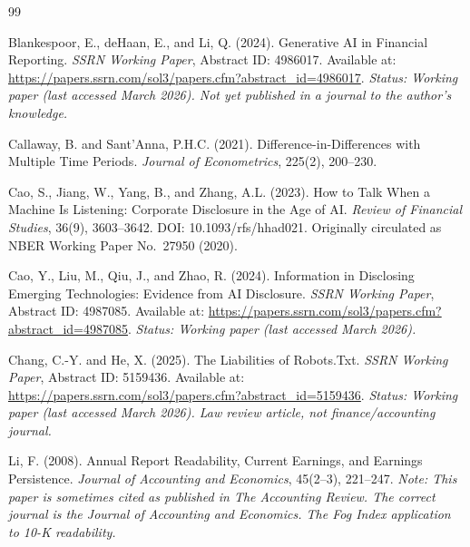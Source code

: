 \documentclass[12pt,a4paper]{article}
\begin{document}

\newpage
\begin{thebibliography}{99}

Blankespoor, E., deHaan, E., and Li, Q. (2024).
\newblock Generative AI in Financial Reporting.
\newblock \emph{SSRN Working Paper}, Abstract ID: 4986017.
\newblock Available at: \url{https://papers.ssrn.com/sol3/papers.cfm?abstract_id=4986017}.
\newblock \textit{Status: Working paper (last accessed March 2026). Not yet published in a journal to the author's knowledge.}

Callaway, B. and Sant'Anna, P.H.C. (2021).
\newblock Difference-in-Differences with Multiple Time Periods.
\newblock \emph{Journal of Econometrics}, 225(2), 200--230.

Cao, S., Jiang, W., Yang, B., and Zhang, A.L. (2023).
\newblock How to Talk When a Machine Is Listening: Corporate Disclosure in the Age of AI.
\newblock \emph{Review of Financial Studies}, 36(9), 3603--3642.
\newblock DOI: 10.1093/rfs/hhad021. Originally circulated as NBER Working Paper No.\ 27950 (2020).

Cao, Y., Liu, M., Qiu, J., and Zhao, R. (2024).
\newblock Information in Disclosing Emerging Technologies: Evidence from AI Disclosure.
\newblock \emph{SSRN Working Paper}, Abstract ID: 4987085.
\newblock Available at: \url{https://papers.ssrn.com/sol3/papers.cfm?abstract_id=4987085}.
\newblock \textit{Status: Working paper (last accessed March 2026).}

Chang, C.-Y. and He, X. (2025).
\newblock The Liabilities of Robots.Txt.
\newblock \emph{SSRN Working Paper}, Abstract ID: 5159436.
\newblock Available at: \url{https://papers.ssrn.com/sol3/papers.cfm?abstract_id=5159436}.
\newblock \textit{Status: Working paper (last accessed March 2026). Law review article, not finance/accounting journal.}

Li, F. (2008).
\newblock Annual Report Readability, Current Earnings, and Earnings Persistence.
\newblock \emph{Journal of Accounting and Economics}, 45(2--3), 221--247.
\newblock \textit{Note: This paper is sometimes cited as published in The Accounting Review. The correct journal is the Journal of Accounting and Economics. The Fog Index application to 10-K readability.}


\end{thebibliography}
\end{document}
